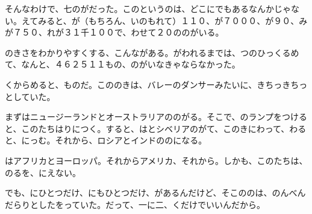 そんなわけで、七のがだった。このというのは、どこにでもあるなんかじゃない。えてみると、が（もちろん、いのもれて）１１０、が７０００、が９０、みが７５０、れが３１千１００で、わせて２０ののがいる。

のきさをわかりやすくする、こんながある。がわれるまでは、つのひっくるめて、なんと、４６２５１１もの、のがいなきゃならなかった。

くからめると、ものだ。こののきは、バレーのダンサーみたいに、きちっきちっとしていた。

まずはニュージーランドとオーストラリアののがる。そこで、のランプをつけると、このたちはりにつく。すると、はとシベリアのがて、このきにわって、わると、にっむ。それから、ロシアとインドののになる。

はアフリカとヨーロッパ。それからアメリカ、それから。しかも、このたちは、のるを、にえない。

でも、にひとつだけ、にもひとつだけ、があるんだけど、そこののは、のんべんだらりとしたをっていた。だって、一に二、くだけでいいんだから。


